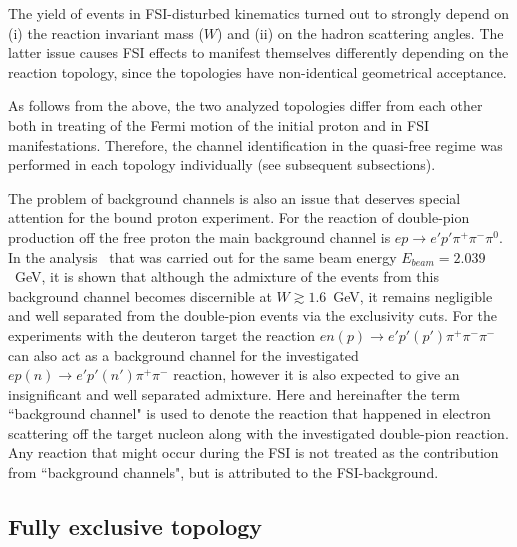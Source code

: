 The yield of events in FSI-disturbed kinematics turned out to strongly depend on (i) the reaction invariant mass ($W$) and (ii) on the hadron scattering angles. The latter issue causes FSI effects to manifest themselves differently depending on the reaction topology, since the topologies have non-identical geometrical acceptance.%

As follows from the above, the two analyzed topologies differ from each other both in treating of the Fermi motion of the initial proton and in FSI manifestations. Therefore, the channel identification in the quasi-free regime was performed in each topology individually (see subsequent subsections). 


The problem of background channels is also an issue that deserves special attention for the bound proton experiment. For the reaction of double-pion production off the free proton the main background channel is $ep\rightarrow e'p'\pi^{+}\pi^{-}\pi^{0}$. In the analysis~\cite{Fed_an_note:2017} that was carried out for the same beam energy $E_{beam} = 2.039$~GeV, it is shown that although the admixture of the events from this background channel becomes discernible at $W\gtrsim 1.6$~GeV, it remains negligible and well separated from the double-pion events via the exclusivity cuts. For the experiments with the deuteron target the reaction $en(p) \rightarrow e'p'(p')\pi^{+}\pi^{-}\pi^{-}$ can also act as a background channel for the investigated $ep(n) \rightarrow e'p'(n')\pi^{+}\pi^{-}$ reaction, however it is also expected to give an insignificant and well separated admixture. Here and hereinafter the term ``background channel" is used to denote the reaction that happened in electron scattering off the target nucleon along with the investigated double-pion reaction. Any reaction that might occur during the FSI is not treated as the contribution from ``background channels", but is attributed to the FSI-background.



\subsection{Fully exclusive topology}
\label{Sect:excl_cut_fully_excl}


